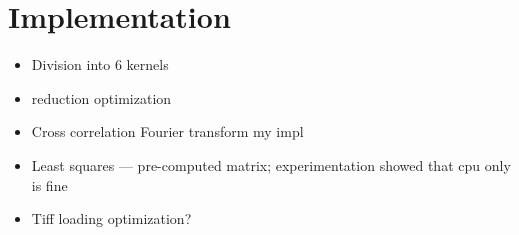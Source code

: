 \chapter{Implementation}

\begin{itemize}
	\item Division into 6 kernels
	\item reduction optimization
	\item Cross correlation
	\subitem Fourier transform
	\subitem my impl
	\item Least squares --- pre-computed matrix; experimentation showed that cpu only is fine
	\item Tiff loading optimization?
\end{itemize}